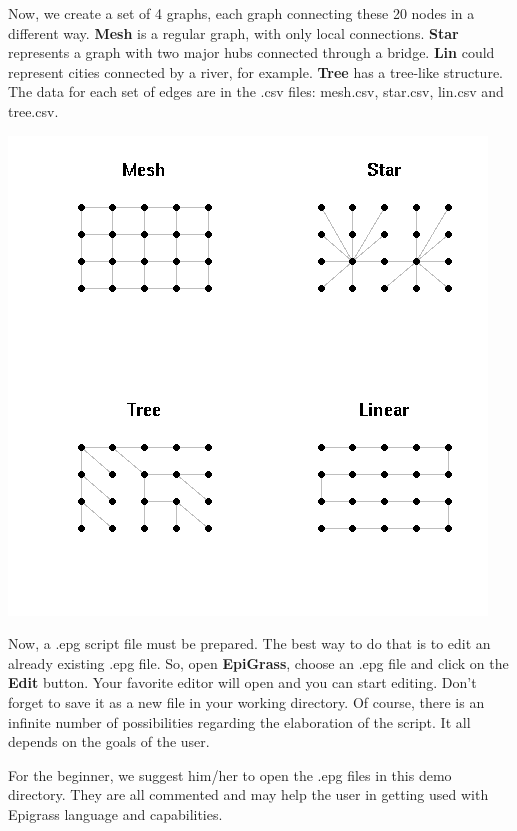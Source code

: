 Now, we create a set of 4 graphs, each graph connecting these 20 nodes in a different way. \textbf{Mesh} is a regular graph, with only local connections. \textbf{Star} represents a graph with two major hubs connected through a bridge. \textbf{Lin} could represent cities connected by a river, for example. \textbf{Tree} has a tree-like structure. The data for each set of edges are in the .csv files: mesh.csv, star.csv, lin.csv and tree.csv. 

\begin{center}
\includegraphics[scale=0.5]{artgraphs.png}
\label{fig:artgraphs}
\end{center}

Now, a .epg script file must be prepared. The best way to do that is to edit an already existing .epg file. So, open \textbf{EpiGrass}, choose an .epg file and click on the \textbf{Edit} button. Your favorite editor will open and you can start editing. Don't forget to save it as a new file in your working directory. Of course, there is an infinite number of possibilities regarding the elaboration of the script. It all depends on the goals of the user. 

For the beginner, we suggest him/her to open the .epg files in this demo directory. They are all commented and may help the user in getting used with Epigrass language and capabilities.

